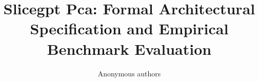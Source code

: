 \title{\textbf{Slicegpt Pca: Formal Architectural Specification and Empirical Benchmark Evaluation}}

\author{Anonymous authors}
